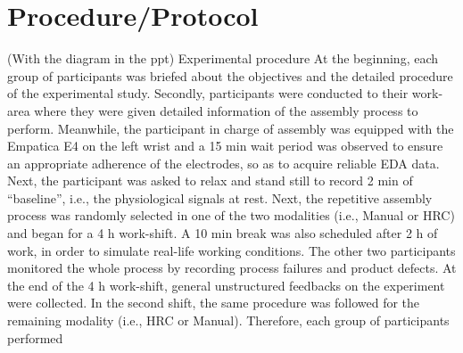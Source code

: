 \section{Procedure/Protocol}
(With the diagram in the ppt)
Experimental procedure At the beginning, each group of participants was briefed about the objectives and the detailed procedure of the experimental study. Secondly, participants were conducted to their work-area where they were given detailed information of the assembly process to perform. Meanwhile, the participant in charge of assembly was equipped with the Empatica E4 on the left wrist and a 15 min wait period was observed to ensure an appropriate adherence of the electrodes, so as to acquire reliable EDA data. Next, the participant was asked to relax and stand still to record 2 min of “baseline”, i.e., the physiological signals at rest. Next, the repetitive assembly process was randomly selected in one of the two modalities (i.e., Manual or HRC) and began for a 4 h work-shift. A 10 min break was also scheduled after 2 h of work, in order to simulate real-life working conditions. The other two participants monitored the whole process by recording process failures and product defects. At the end of the 4 h work-shift, general unstructured feedbacks on the experiment were collected. In the second shift, the same procedure was followed for the remaining modality (i.e., HRC or Manual). Therefore, each group of participants performed